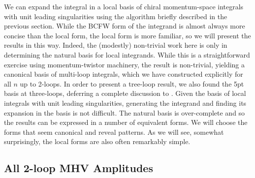 \documentclass[11pt, reqno]{article}
\begin{document}
We can expand the integral in a local basis of chiral momentum-space integrals with unit leading singularities using the algorithm briefly described in the previous section. While the BCFW form of the integrand is almost always more concise than the local form, the local form is more familiar, so we will present the results in this way. Indeed, the (modestly) non-trivial work here is only in determining the natural basis for local integrands. While this is a straightforward exercise using momentum-twistor machinery, the result is non-trivial, yielding a canonical basis of multi-loop integrals, which we have constructed explicitly for all $n$ up to 2-loops. In order to present a tree-loop result, we also found the 5pt basis at three-loops, deferring a complete discussion to \cite{InPrep}. Given the basis of local integrals with unit leading singularities, generating the integrand and finding its expansion in the basis is not difficult. The natural basis is over-complete and so the results can be expressed in a number of equivalent forms. We will choose the forms that seem canonical and reveal patterns.  As we will see, somewhat surprisingly, the local forms are also often remarkably simple.

\subsection{All 2-loop MHV Amplitudes}
\end{document}
